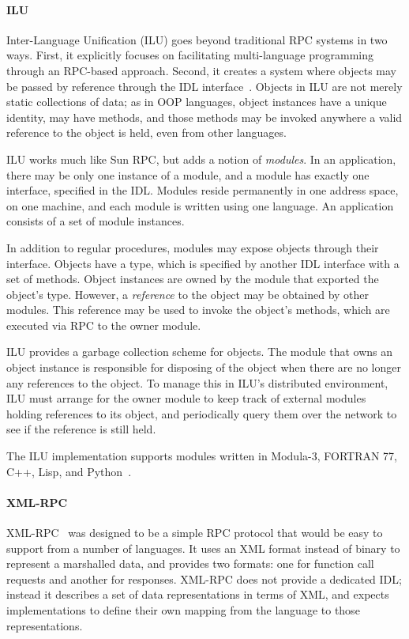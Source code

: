 \paragraph{ILU}

Inter-Language Unification (ILU) goes beyond traditional RPC systems in two ways. First, it explicitly focuses on facilitating multi-language programming through an RPC-based approach. Second, it creates a system where objects may be passed by reference through the IDL interface~\cite{janssen94ilu}. Objects in ILU are not merely static collections of data; as in OOP languages, object instances have a unique identity, may have methods, and those methods may be invoked anywhere a valid reference to the object is held, even from other languages.

ILU works much like Sun RPC, but adds a notion of \emph{modules}. In an application, there may be only one instance of a module, and a module has exactly one interface, specified in the IDL. Modules reside permanently in one address space, on one machine, and each module is written using one language. An application consists of a set of module instances.

In addition to regular procedures, modules may expose objects through their interface. Objects have a type, which is specified by another IDL interface with a set of methods. Object instances are owned by the module that exported the object's type. However, a \emph{reference} to the object may be obtained by other modules. This reference may be used to invoke the object's methods, which are executed via RPC to the owner module.

ILU provides a garbage collection scheme for objects. The module that owns an object instance is responsible for disposing of the object when there are no longer any references to the object. To manage this in ILU's distributed environment, ILU must arrange for the owner module to keep track of external modules holding references to its object, and periodically query them over the network to see if the reference is still held.

The ILU implementation supports modules written in Modula-3,
FORTRAN 77, C++, Lisp, and Python~\cite{janssen94ilu}.

\paragraph{XML-RPC}

XML-RPC~\cite{spec03xmlrpc} was designed to be a simple RPC protocol that would be easy to support from a number of languages. It uses an XML format instead of binary to represent a marshalled data, and provides two formats: one for function call requests and another for responses. XML-RPC does not provide a dedicated IDL; instead it describes a set of data representations in terms of XML, and expects implementations to define their own mapping from the language to those representations.

